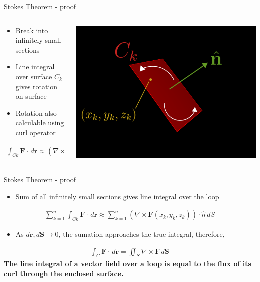\documentclass[10pt,aspectratio=169,usenames,dvipsnames]{beamer}
\begin{document}
\begin{frame}{Stokes Theorem - proof}
\begin{columns}
\begin{column}{0.5\textwidth}
\begin{itemize}
    \item Break into infinitely small sections
    \item Line integral over surface $C_k$ gives rotation on surface
    \item Rotation also calculable using curl operator
\end{itemize}
\begin{gather}
    \int_{Ck} \textbf{F} \cdot \,d\textbf{r} \approx \left( \nabla \times \textbf{F}(x_k,y_k,z_k) \right) \cdot \hat{n} \,dS
\end{gather}
\end{column}
\begin{column}{0.5\textwidth}
\includegraphics[width=0.8\linewidth]{2023StAndrews/ds.png}
\end{column}
\end{columns}
\end{frame}

\begin{frame}{Stokes Theorem - proof}
\begin{itemize}
    \item Sum of all infinitely small sections gives line integral over the loop
\end{itemize}
\begin{gather}
    \sum_{k=1}^{n} \int_{Ck} \textbf{F} \cdot \,d\textbf{r} \approx \sum_{k=1}^{n}  \left( \nabla \times \textbf{F}(x_k,y_k,z_k) \right) \cdot \hat{n} \,dS
\end{gather}
\begin{itemize}
    \item As $d\textbf{r},d\textbf{S} \xrightarrow{} 0$, the sumation approaches the true integral, therefore,
\end{itemize}
\begin{gather}
    \int_C \textbf{F} \cdot \,d\textbf{r} = \iint_S \nabla \times \textbf{F} \,d\textbf{S}
\end{gather}
\textbf{The line integral of a vector field over a loop is equal to the flux of its curl through the enclosed surface.}
\end{frame}
\end{document}
